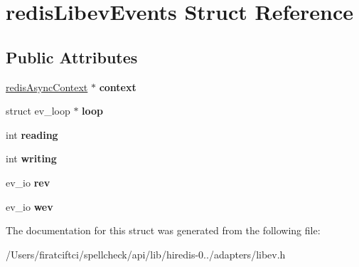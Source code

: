 \hypertarget{structredis_libev_events}{}\section{redis\+Libev\+Events Struct Reference}
\label{structredis_libev_events}
\subsection*{Public Attributes}
\begin{DoxyCompactItemize}
\item 
\mbox{\label{structredis_libev_events_a12a3124353d8ac0373dc98a5b17c8dfa}} 
\mbox{\hyperlink{structredis_async_context}{redis\+Async\+Context}} $\ast$ {\bfseries context}
\item 
\mbox{\label{structredis_libev_events_a1dc7b8707661197bf4fbc6ac1dd09863}} 
struct ev\+\_\+loop $\ast$ {\bfseries loop}
\item 
\mbox{\label{structredis_libev_events_ab1022986503c856751f079b51961b138}} 
int {\bfseries reading}
\item 
\mbox{\label{structredis_libev_events_aef8f75036cbadd7f5be8bfe68f0acd0b}} 
int {\bfseries writing}
\item 
\mbox{\label{structredis_libev_events_ad0cd2c0f113825469aeedcbf432f5ba9}} 
ev\+\_\+io {\bfseries rev}
\item 
\mbox{\label{structredis_libev_events_ad5d01dc29a5be94df3d8c92ed1ae68e1}} 
ev\+\_\+io {\bfseries wev}
\end{DoxyCompactItemize}


The documentation for this struct was generated from the following file\+:\begin{DoxyCompactItemize}
\item 
/\+Users/firatciftci/spellcheck/api/lib/hiredis-\/0../adapters/libev.\+h\end{DoxyCompactItemize}
